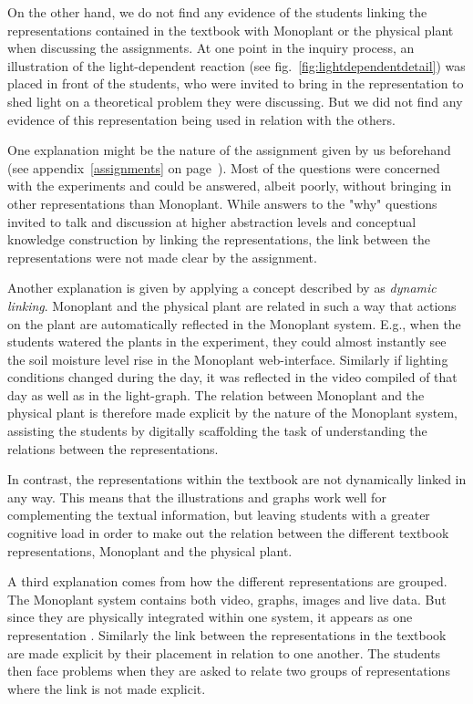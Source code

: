 On the other hand, we do not find any evidence of the students linking the representations contained in the textbook with Monoplant or the physical plant when discussing the assignments. At one point in the inquiry process, an illustration of the light-dependent reaction (see fig.~\ref{fig:lightdependentdetail}) was placed in front of the students, who were invited to bring in the representation to shed light on a theoretical problem they were discussing. But we did not find any evidence of this representation being used in relation with the others. 

One explanation might be the nature of the assignment given by us beforehand (see appendix~\ref{assignments} on page~\pageref{assignments}). Most of the questions were concerned with the experiments and could be answered, albeit poorly, without bringing in other representations than Monoplant. While answers to the "why" questions invited to talk and discussion at higher abstraction levels and conceptual knowledge construction by linking the representations, the link between the representations were not made clear by the assignment. 

Another explanation is given by applying a concept described by \citet{van2006supporting} as \emph{dynamic linking}. Monoplant and the physical plant are related in such a way that actions on the plant are automatically reflected in the Monoplant system. E.g., when the students watered the plants in the experiment, they could almost instantly see the soil moisture level rise in the Monoplant web-interface. Similarly if lighting conditions changed during the day, it was reflected in the video compiled of that day as well as in the light-graph. The relation between Monoplant and the physical plant is therefore made explicit by the nature of the Monoplant system, assisting the students by digitally scaffolding the task of understanding the relations between the representations. 

In contrast, the representations within the textbook are not dynamically linked in any way. This means that the illustrations and graphs work well for complementing the textual information, but leaving students with a greater cognitive load in order to make out the relation between the different textbook representations, Monoplant and the physical plant. 

A third explanation comes from how the different representations are grouped. The Monoplant system contains both video, graphs, images and live data. But since they are physically integrated within one system, it appears as one representation \citep{van2006supporting}. Similarly the link between the representations in the textbook are made explicit by their placement in relation to one another. The students then face problems when they are asked to relate two groups of representations where the link is not made explicit. 

